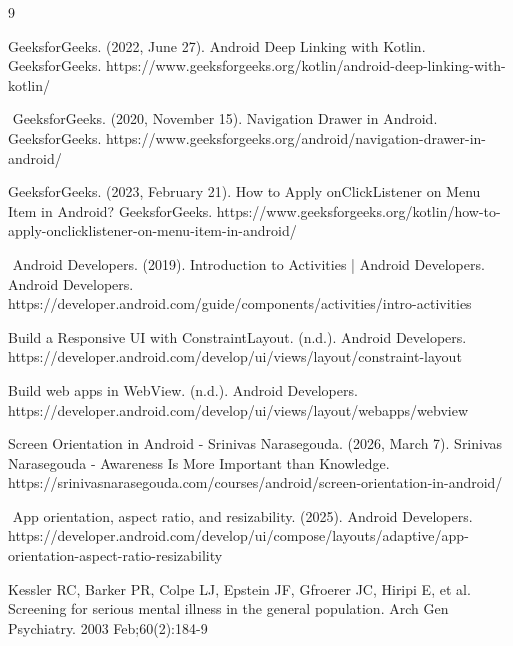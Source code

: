 \documentclass{article}
\begin{document}
\begin{thebibliography}{9}

GeeksforGeeks. (2022, June 27). Android Deep Linking with Kotlin. GeeksforGeeks. https://www.geeksforgeeks.org/kotlin/android-deep-linking-with-kotlin/

‌
GeeksforGeeks. (2020, November 15). Navigation Drawer in Android. GeeksforGeeks. https://www.geeksforgeeks.org/android/navigation-drawer-in-android/

GeeksforGeeks. (2023, February 21).  How to Apply onClickListener on Menu Item in Android? GeeksforGeeks. https://www.geeksforgeeks.org/\allowbreak kotlin/how-to-apply-\allowbreak onclicklistener-on-menu-item-in-android/

‌
Android Developers. (2019). Introduction to Activities  |  Android Developers. Android Developers. https://developer.android.com/guide/components/activities/intro-activities

Build a Responsive UI with ConstraintLayout. (n.d.). Android Developers. https://developer.android.com/develop/ui/views/layout/constraint-layout

Build web apps in WebView. (n.d.). Android Developers. https://developer.android.com/develop/ui/views/layout/webapps/webview

Screen Orientation in Android - Srinivas Narasegouda. (2026, March 7). Srinivas Narasegouda - Awareness Is More Important than Knowledge. https://srinivasnarasegouda.com/courses/android/screen-orientation-in-android/

‌
App orientation, aspect ratio, and resizability. (2025). Android Developers. https://developer.android.com/develop/ui/compose/layouts/adaptive/app-orientation-aspect-ratio-resizability

Kessler RC, Barker PR, Colpe LJ, Epstein JF, Gfroerer JC, Hiripi E, et al. Screening for serious mental illness in the general population. Arch Gen Psychiatry. 2003 Feb;60(2):184-9

‌

‌

\end{thebibliography}
\end{document}
